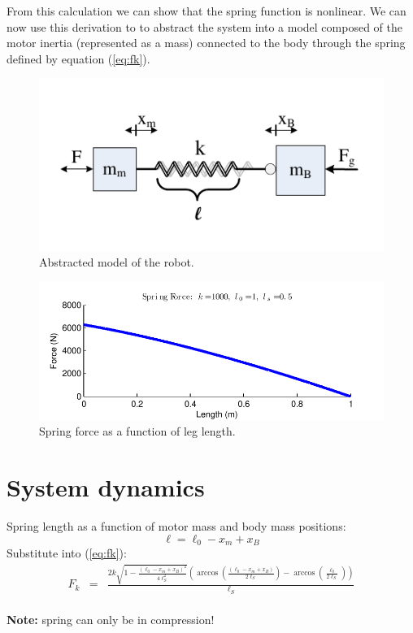 \documentclass[letterpaper, 12 pt]{article}  %
\begin{document}
	From this calculation we can show that the spring function is nonlinear.  We
	can now use this derivation to to abstract the system into a model composed of
	the motor inertia (represented as a mass) connected to the body through the spring
	defined by equation (\ref{eq:fk}).

	\begin{figure}[h]
		\centering
		\includegraphics[scale=1.2]{./images/SEDA_atrias_simple.pdf}
		\caption{	Abstracted model of the robot.}
		\label{fig:SEDA}
	\end{figure}


	\begin{figure}[h]
		\centering
		\includegraphics[scale=1]{./images/SpringFunction.pdf}
		\caption{	Spring force as a function of leg length.}
		\label{fig:SEDA}
	\end{figure}


\section{System dynamics}


	Spring length as a function of motor mass and body mass positions:
	\[
	\ell=\ell_{0}-x_{m}+x_{B}
	\]
	Substitute into (\ref{eq:fk}):
	\begin{eqnarray*}
	F_{k} & = & \frac{2k\sqrt{1-\frac{\left(\ell_{0}-x_{m}+x_{B}\right)^{2}}{4\ell_{S}^{2}}}\left(\arccos\left(\frac{\left(\ell_{0}-x_{m}+x_{B}\right)}{2\ell_{S}}\right)-\arccos\left(\frac{\ell_{0}}{2\ell_{S}}\right)\right)}{\ell_{S}}
	\end{eqnarray*}
	\\
	\textbf{Note:} spring can only be in compression!
\end{document}
